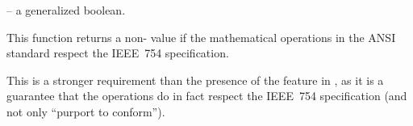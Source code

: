 \documentclass[../Environment-Queries.tex]{subfiles}
\begin{document}

\DSyntax{}

 
\RArrow {}

\DArgsNValues{}

 -- a generalized boolean.


\DDescription{}

This function returns a non- value if the mathematical
operations in the ANSI \CL{} standard \cite{1996:ANSIHyperSpec} respect the
IEEE~754 specification.

\DNotes{}

This is a stronger requirement than the
presence of the  feature in
, as it is a guarantee that the operations do in
fact respect the IEEE~754 specification (and not only ``purport to
conform'').
\end{document}
